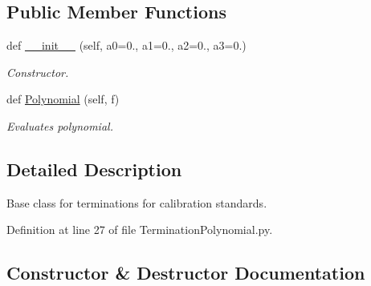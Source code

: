 \subsection*{Public Member Functions}
\begin{DoxyCompactItemize}
\item 
def \hyperlink{classSignalIntegrity_1_1Measurement_1_1CalKit_1_1Standards_1_1TerminationPolynomial_1_1TerminationPolynomial_a04c35e5daa8bdd47fdfe72060fe394d2}{\+\_\+\+\_\+init\+\_\+\+\_\+} (self, a0=0., a1=0., a2=0., a3=0.)
\begin{DoxyCompactList}\small\item\em Constructor. \end{DoxyCompactList}\item 
def \hyperlink{classSignalIntegrity_1_1Measurement_1_1CalKit_1_1Standards_1_1TerminationPolynomial_1_1TerminationPolynomial_ab268105477bd1955b7bfcb4450295fad}{Polynomial} (self, f)
\begin{DoxyCompactList}\small\item\em Evaluates polynomial. \end{DoxyCompactList}\end{DoxyCompactItemize}


\subsection{Detailed Description}
Base class for terminations for calibration standards. 

Definition at line 27 of file Termination\+Polynomial.\+py.



\subsection{Constructor \& Destructor Documentation}
\mbox{\label{classSignalIntegrity_1_1Measurement_1_1CalKit_1_1Standards_1_1TerminationPolynomial_1_1TerminationPolynomial_a04c35e5daa8bdd47fdfe72060fe394d2}} 
